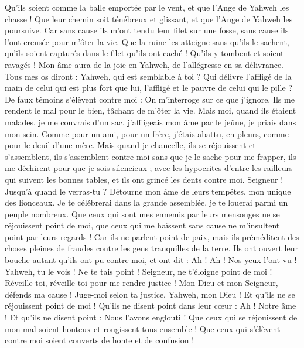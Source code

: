 \begin{multicols}{2}
Qu'ils soient comme la balle emportée par le vent, et que l'Ange de Yahweh les chasse !
Que leur chemin soit ténébreux et glissant, et que l'Ange de Yahweh les poursuive.
Car sans cause ils m'ont tendu leur filet sur une fosse, sans cause ils l'ont creusée pour m'ôter la vie.
Que la ruine les atteigne sans qu'ils le sachent, qu'ils soient capturés dans le filet qu'ils ont caché ! Qu'ils y tombent et soient ravagés !
Mon âme aura de la joie en Yahweh, de l'allégresse en sa délivrance.
Tous mes os diront : Yahweh, qui est semblable à toi ? Qui délivre l'affligé de la main de celui qui est plus fort que lui, l'affligé et le pauvre de celui qui le pille ?
De faux témoins s'élèvent contre moi : On m'interroge sur ce que j'ignore.
Ils me rendent le mal pour le bien, tâchant de m'ôter la vie.
Mais moi, quand ils étaient malades, je me couvrais d'un sac, j'affligeais mon âme par le jeûne, je priais dans mon sein.
Comme pour un ami, pour un frère, j'étais abattu, en pleurs, comme pour le deuil d'une mère.
Mais quand je chancelle, ils se réjouissent et s'assemblent, ils s'assemblent contre moi sans que je le sache pour me frapper, ils me déchirent pour que je sois silencieux ;
avec les hypocrites d’entre les railleurs qui suivent les bonnes tables, et ils ont grincé les dents contre moi.
Seigneur ! Jusqu'à quand le verras-tu ? Détourne mon âme de leurs tempêtes, mon unique des lionceaux.
Je te célébrerai dans la grande assemblée, je te louerai parmi un peuple nombreux.
Que ceux qui sont mes ennemis par leurs mensonges ne se réjouissent point de moi, que ceux qui me haïssent sans cause ne m'insultent point par leurs regards !
Car ils ne parlent point de paix, mais ils préméditent des choses pleines de fraudes contre les gens tranquilles de la terre.
Ils ont ouvert leur bouche autant qu'ils ont pu contre moi, et ont dit : Ah ! Ah ! Nos yeux l'ont vu !
Yahweh, tu le vois ! Ne te tais point ! Seigneur, ne t'éloigne point de moi !
Réveille-toi, réveille-toi pour me rendre justice ! Mon Dieu et mon Seigneur, défends ma cause !
Juge-moi selon ta justice, Yahweh, mon Dieu ! Et qu'ils ne se réjouissent point de moi !
Qu'ils ne disent point dans leur cœur : Ah ! Notre âme ! Et qu'ils ne disent point : Nous l'avons englouti !
Que ceux qui se réjouissent de mon mal soient honteux et rougissent tous ensemble ! Que ceux qui s'élèvent contre moi soient couverts de honte et de confusion !

\end{multicols}
